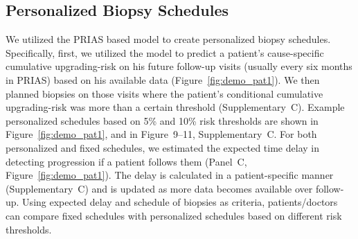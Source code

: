 \subsection{Personalized Biopsy Schedules}
We utilized the PRIAS based model to create personalized biopsy schedules. Specifically, first, we utilized the model to predict a patient's cause-specific cumulative upgrading-risk on his future follow-up visits (usually every six months in PRIAS) based on his available data (Figure~\ref{fig:demo_pat1}). We then planned biopsies on those visits where the patient's conditional cumulative upgrading-risk was more than a certain threshold (Supplementary~C). Example personalized schedules based on 5\% and 10\% risk thresholds are shown in Figure~\ref{fig:demo_pat1}, and in Figure~9--11, Supplementary~C. For both personalized and fixed schedules, we estimated the expected time delay in detecting progression if a patient follows them (Panel~C, Figure~\ref{fig:demo_pat1}). The delay is calculated in a patient-specific manner (Supplementary~C) and is updated as more data becomes available over follow-up. Using expected delay and schedule of biopsies as criteria, patients/doctors can compare fixed schedules with personalized schedules based on different risk thresholds.

